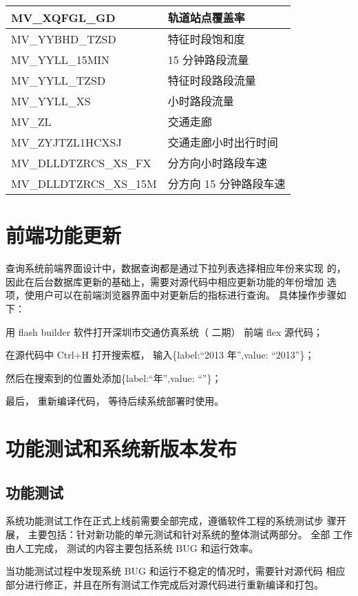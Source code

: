 \begin{longtable}[c] {|C{0.35\textwidth}|C{0.35\textwidth}|}
MV\_XQFGL\_GD & 轨道站点覆盖率 \\\hline
MV\_YYBHD\_TZSD & 特征时段饱和度 \\\hline
MV\_YYLL\_15MIN & 15 分钟路段流量 \\\hline
MV\_YYLL\_TZSD & 特征时段路段流量 \\\hline
MV\_YYLL\_XS & 小时路段流量 \\\hline
MV\_ZL & 交通走廊   \\\hline 
MV\_ZYJTZL1HCXSJ & 交通走廊小时出行时间 \\\hline
MV\_DLLDTZRCS\_XS\_FX & 分方向小时路段车速 \\\hline
MV\_DLLDTZRCS\_XS\_15M & 分方向 15 分钟路段车速 \\\hline
\end{longtable}

\section{前端功能更新}
查询系统前端界面设计中，数据查询都是通过下拉列表选择相应年份来实现
的，因此在后台数据库更新的基础上，需要对源代码中相应更新功能的年份增加
\pyear 选项，使用户可以在前端浏览器界面中对更新后的指标进行查询。 具体操作步骤如下：

\begin{nbeae}
\item 用 flash builder 软件打开深圳市交通仿真系统（ 二期） 前端 flex 源代码；
\item 在源代码中 Ctrl+H 打开搜索框， 输入\{label:``2013 年'',value: ``2013''\}；
\item 然后在搜索到的位置处添加\{label:``\pyear 年'',value: ``\pyear''\}；
\item 最后， 重新编译代码， 等待后续系统部署时使用。
\end{nbeae}

\section{功能测试和系统新版本发布}
\subsection{功能测试}
系统功能测试工作在正式上线前需要全部完成，遵循软件工程的系统测试步
骤开展， 主要包括：针对新功能的单元测试和针对系统的整体测试两部分。 全部
工作由人工完成， 测试的内容主要包括系统 BUG 和运行效率。

当功能测试过程中发现系统 BUG 和运行不稳定的情况时，需要针对源代码
相应部分进行修正，并且在所有测试工作完成后对源代码进行重新编译和打包。

